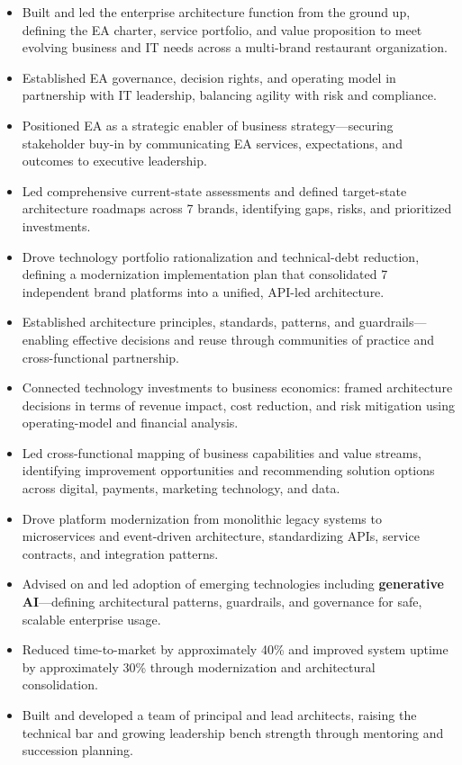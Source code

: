 \documentclass[11pt]{article}
\begin{document}
\begin{itemize}
  \item Built and led the enterprise architecture function from the ground up, defining the EA charter, service portfolio, and value proposition to meet evolving business and IT needs across a multi-brand restaurant organization.
  \item Established EA governance, decision rights, and operating model in partnership with IT leadership, balancing agility with risk and compliance.
  \item Positioned EA as a strategic enabler of business strategy---securing stakeholder buy-in by communicating EA services, expectations, and outcomes to executive leadership.
  \item Led comprehensive current-state assessments and defined target-state architecture roadmaps across 7 brands, identifying gaps, risks, and prioritized investments.
  \item Drove technology portfolio rationalization and technical-debt reduction, defining a modernization implementation plan that consolidated 7 independent brand platforms into a unified, API-led architecture.
  \item Established architecture principles, standards, patterns, and guardrails---enabling effective decisions and reuse through communities of practice and cross-functional partnership.
  \item Connected technology investments to business economics: framed architecture decisions in terms of revenue impact, cost reduction, and risk mitigation using operating-model and financial analysis.
  \item Led cross-functional mapping of business capabilities and value streams, identifying improvement opportunities and recommending solution options across digital, payments, marketing technology, and data.
  \item Drove platform modernization from monolithic legacy systems to microservices and event-driven architecture, standardizing APIs, service contracts, and integration patterns.
  \item Advised on and led adoption of emerging technologies including \textbf{generative AI}---defining architectural patterns, guardrails, and governance for safe, scalable enterprise usage.
  \item Reduced time-to-market by approximately 40\% and improved system uptime by approximately 30\% through modernization and architectural consolidation.
  \item Built and developed a team of principal and lead architects, raising the technical bar and growing leadership bench strength through mentoring and succession planning.
\end{itemize}
\end{document}
